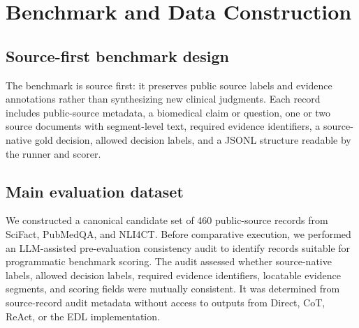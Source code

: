 \documentclass[11pt,a4paper]{article}
\begin{document}
\begin{table}[H]
\centering
\caption{EDL components mapped to audit risks and evaluation checks.}
\label{tab:method-risk}
\end{table}

\section{Benchmark and Data Construction}

\subsection{Source-first benchmark design}

The benchmark is source first: it preserves public source labels and evidence annotations rather than synthesizing new clinical judgments. Each record includes public-source metadata, a biomedical claim or question, one or two source documents with segment-level text, required evidence identifiers, a source-native gold decision, allowed decision labels, and a JSONL structure readable by the runner and scorer.

\subsection{Main evaluation dataset}

We constructed a canonical candidate set of 460 public-source records from SciFact, PubMedQA, and NLI4CT. Before comparative execution, we performed an LLM-assisted pre-evaluation consistency audit to identify records suitable for programmatic benchmark scoring. The audit assessed whether source-native labels, allowed decision labels, required evidence identifiers, locatable evidence segments, and scoring fields were mutually consistent. It was determined from source-record audit metadata without access to outputs from Direct, CoT, ReAct, or the EDL implementation.
\end{document}
